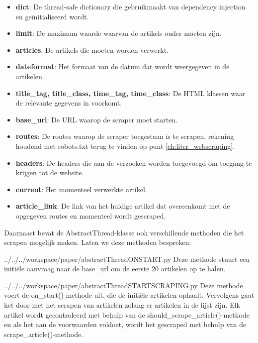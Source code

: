     \begin{itemize}
        \item \textbf{dict}: De thread-safe dictionary die gebruikmaakt van dependency injection en geïnitialiseerd wordt.
        \item \textbf{limit}: De maximum waarde waarvan de artikels ouder moeten zijn.
        \item \textbf{articles}: De artikels die moeten worden verwerkt.
        \item \textbf{dateformat}: Het formaat van de datum dat wordt weergegeven in de artikelen.
        \item \textbf{title\_tag, title\_class, time\_tag, time\_class}: De HTML klassen waar de relevante gegevens in voorkomt.
        \item \textbf{base\_url}: De URL waarop de scraper moet starten.
        \item \textbf{routes}: De routes waarop de scraper toegestaan is te scrapen, rekening houdend met robots.txt terug te vinden op punt \ref{ch:liter_webscraping}.
        \item \textbf{headers}: De headers die aan de verzoeken worden toegevoegd om toegang te krijgen tot de website.
        \item \textbf{current}: Het momenteel verwerkte artikel.
        \item \textbf{article\_link}: De link van het huidige artikel dat overeenkomt met de opgegeven routes en momenteel wordt gescraped. \\
    \end{itemize}

Daarnaast bevat de AbstractThread-klasse ook verschillende methoden die het scrapen mogelijk maken. Laten we deze methoden bespreken:

\begin{pythoncode}{../../../workspace/paper/abstractThreadONSTART.py}
 Deze methode stuurt een initiële aanvraag naar de base\_url om de eerste 20 artikelen op te halen.
\end{pythoncode}

\begin{pythoncode}{../../../workspace/paper/abstractThreadSTARTSCRAPING.py}
Deze methode voert de on\_start()-methode uit, die de initiële artikelen ophaalt. Vervolgens gaat het door met het scrapen van artikelen zolang er artikelen in de lijst zijn. Elk artikel wordt gecontroleerd met behulp van de should\_scrape\_article()-methode en als het aan de voorwaarden voldoet, wordt het gescraped met behulp van de scrape\_article()-methode.
\end{pythoncode}

